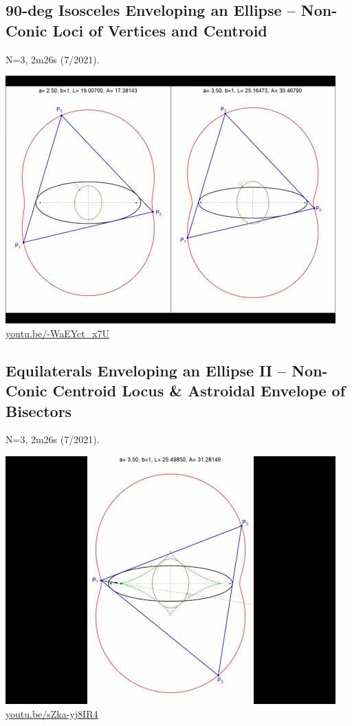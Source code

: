 \documentclass[12pt]{amsart}
\begin{document}
\subsection{90-deg Isosceles Enveloping an Ellipse -- Non-Conic Loci of Vertices and Centroid}
\label{vid:-WaEYct_x7U}
\noindent N=3, 2m26s (7/2021). 
\begin{center}\includegraphics[width=.5\textwidth]{pics/-WaEYct_x7U.jpg} \\ 
\href{https://youtu.be/-WaEYct_x7U}{\url{youtu.be/-WaEYct\_x7U}}\end{center}
% 

\subsection{Equilaterals Enveloping an Ellipse II -- Non-Conic Centroid Locus \& Astroidal Envelope of Bisectors}
\label{vid:sZka-yj8IR4}
\noindent N=3, 2m26s (7/2021). 
\begin{center}\includegraphics[width=.5\textwidth]{pics/sZka-yj8IR4.jpg} \\ 
\href{https://youtu.be/sZka-yj8IR4}{\url{youtu.be/sZka-yj8IR4}}\end{center}
% 
\end{document}
